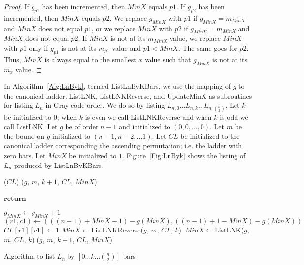 \begin{theorem}
\begin{theorem}
\begin{proof}
 If $g_{p1}$ has been incremented, then $MinX$ equals $p1$. If $g_{p2}$ has been incremented, then $MinX$ equals $p2$. We replace 
 $g_{MinX}$ with $p1$ if $g_{MinX}=m_{MinX}$ and $MinX$ does not equal $p1$, or we replace $MinX$ with $p2$ if $g_{MinX}=m_{MinX}$ 
 and $MinX$ does not equal $p2$. If $MinX$ is not at its $m_{MinX}$ value, we replace $MinX$ with $p1$ only if $g_{p1}$ is not 
 at its $m_{p1}$ value and $p1<MinX$. The same goes for $p2$. Thus, $MinX$ is always equal to the smallest $x$ value such that $g_{MinX}$ 
 is not at its $m_{x}$ value.  
\end{proof}

In Algorithm~\ref{Alg:LnByk}, termed {\sc ListLnByKBars}, we use the mapping of $g$ to the canonical ladder, 
{\sc ListLNK}, {\sc ListLNKReverse}, and {\sc UpdateMinX} as subroutines 
for listing $L_{n}$ in Gray code order. We do so by listing 
$L_{n, 0} \dots L_{n, k} \dots L_{n, {n \choose 2}}$. Let $k$ be initialized to $0$; when $k$ is even we call {\sc ListLNKReverse} 
and when $k$ is odd we call {\sc ListLNK}. Let $g$ be of order $n-1$ and initialized to $(0,0, \dots ,0)$. 
Let $m$ be the bound on $g$ initialized to $(n-1, n-2, \dots 1)$. Let $CL$ be initialized to the canonical ladder 
corresponding the ascending permutation; i.e. the ladder with zero bars. Let $MinX$ be initialized to $1$. 
Figure~\ref{Fig:LnByk} shows the listing of $L_{n}$ produced by {\sc ListLnByKBars}.
\begin{algorithm}[ht]
  \begin{algorithmic}[1]
        ($CL$)
        ($g$, $m$, $k+1$, $CL$, $MinX$)
      \EndIf

       \textbf{return}
      \EndIf

      \State $g_{MinX} \gets g_{MinX}+1$
      \State $(r1,c1) \gets (((n-1)+MinX-1)-g(MinX), ((n-1)+1-MinX)-g(MinX))$
      \State $CL[r1][c1] \gets 1$
       $MinX \gets${\sc ListLNKReverse}($g$, $m$, $CL$, $k$)
      \Else $\: MinX \gets${\sc ListLNK}($g$, $m$, $CL$, $k$)
      \EndIf  
      ($g$, $m$, $k+1$, $CL$, $MinX$)

    \EndFunction
  \end{algorithmic}
  \caption{Algorithm to list $L_{n}$ by $[0 \dots k \dots {n \choose 2}]$ bars}
  \label{Alg:LnByk}
\end{algorithm}


\end{theorem}
\end{theorem}
